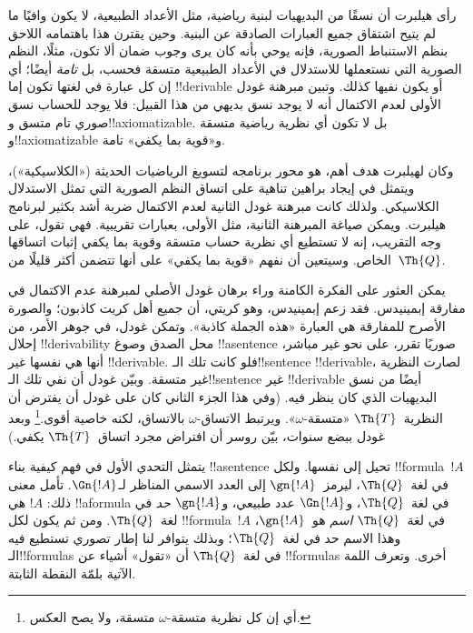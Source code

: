 \documentclass[../../../include/open-logic-section]{subfiles}
\begin{document}


رأى هيلبرت أن نسقًا من البديهيات لبنية رياضية، مثل الأعداد الطبيعية،
لا يكون وافيًا ما لم يتيح اشتقاق جميع العبارات الصادقة عن البنية.
وحين يقترن هذا باهتمامه اللاحق بنظم الاستنباط الصورية، فإنه يوحي بأنه
كان يرى وجوب ضمان ألا تكون، مثلًا، النظم الصورية التي نستعملها
للاستدلال في الأعداد الطبيعية متسقة فحسب، بل \emph{تامة} أيضًا؛ أي إن
كل عبارة في لغتها تكون إما !!{derivable} أو يكون نفيها كذلك. وتبين
مبرهنة غودل الأولى لعدم الاكتمال أنه لا يوجد نسق بديهي من هذا القبيل:
فلا يوجد للحساب نسق صوري تام متسق و!!{axiomatizable}. بل لا تكون أي
نظرية رياضية متسقة و!!{axiomatizable} و«قوية بما يكفي» تامة.

وكان لهيلبرت هدف أهم، هو محور برنامجه لتسويغ الرياضيات الحديثة
(«الكلاسيكية»)، ويتمثل في إيجاد براهين تناهية على اتساق النظم الصورية
التي تمثل الاستدلال الكلاسيكي. ولذلك كانت مبرهنة غودل الثانية لعدم
الاكتمال ضربة أشد بكثير لبرنامج هيلبرت. ويمكن صياغة المبرهنة الثانية،
مثل الأولى، بعبارات تقريبية. فهي تقول، على وجه التقريب، إنه لا تستطيع
أي نظرية حساب متسقة وقوية بما يكفي إثبات اتساقها الخاص. وسيتعين أن نفهم
«قوية بما يكفي» على أنها تتضمن أكثر قليلًا من~$\Th{Q}$.

يمكن العثور على الفكرة الكامنة وراء برهان غودل الأصلي لمبرهنة عدم
الاكتمال في مفارقة إبمينيدس. فقد زعم إبمينيدس، وهو كريتي، أن جميع أهل
كريت كاذبون؛ والصورة الأصرح للمفارقة هي العبارة «هذه الجملة كاذبة».
وتمكن غودل، في جوهر الأمر، من إحلال !!{derivability} محل الصدق وصوغ
!!a{sentence} صوريًا تقرر، على نحو غير مباشر، أنها هي نفسها غير
!!{derivable}. فلو كانت تلك الـ!!{sentence} !!{derivable}، لصارت
النظرية غير متسقة. وبيّن غودل أن نفي تلك الـ!!{sentence} غير
!!{derivable} أيضًا من نسق البديهيات الذي كان ينظر فيه. (وفي هذا الجزء
الثاني كان على غودل أن يفترض أن النظرية~$\Th{T}$ «متسقة-$\omega$».
ويرتبط الاتساق-$\omega$ بالاتساق، لكنه خاصية أقوى.\footnote{أي إن كل
نظرية متسقة-$\omega$ متسقة، ولا يصح العكس.} وبعد غودل ببضع سنوات، بيّن
روسر أن افتراض مجرد اتساق~$\Th{T}$ يكفي.)

يتمثل التحدي الأول في فهم كيفية بناء !!a{sentence} تحيل إلى نفسها.
ولكل !!{formula}~$!A$ في لغة~$\Th{Q}$، ليرمز~$\gn{!A}$ إلى العدد
الاسمي المناظر لـ$\Gn{!A}$. تأمل معنى ذلك: $!A$ هي !!a{formula} في
لغة~$\Th{Q}$، و$\Gn{!A}$ عدد طبيعي، و$\gn{!A}$ \emph{حد} في
لغة~$\Th{Q}$. ومن ثم يكون لكل !!{formula}~$!A$ في لغة~$\Th{Q}$
\emph{اسم} هو~$\gn{!A}$، وهذا الاسم حد في لغة~$\Th{Q}$؛ وبذلك يتوافر
لنا إطار تصوري تستطيع فيه الـ!!{formula}s في لغة~$\Th{Q}$ أن «تقول»
أشياء عن !!{formula}s أخرى. وتعرف اللمة الآتية بلمّة النقطة الثابتة.
\end{document}
